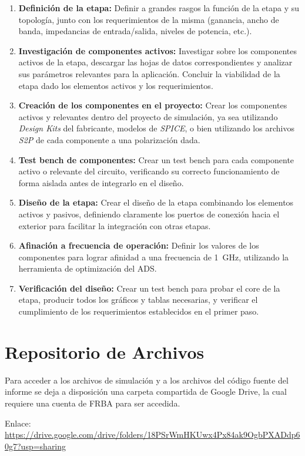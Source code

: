 \begin{enumerate}
    \item \textbf{Definición de la etapa:} Definir a grandes rasgos la función de la etapa y su topología, junto con los requerimientos de la misma (ganancia, ancho de banda, impedancias de entrada/salida, niveles de potencia, etc.).
    
    \item \textbf{Investigación de componentes activos:} Investigar sobre los componentes activos de la etapa, descargar las hojas de datos correspondientes y analizar sus parámetros relevantes para la aplicación. Concluir la viabilidad de la etapa dado los elementos activos y los requerimientos.
    
    \item \textbf{Creación de los componentes en el proyecto:} Crear los componentes activos y relevantes dentro del proyecto de simulación, ya sea utilizando \textit{Design Kits} del fabricante, modelos de \textit{SPICE}, o bien utilizando los archivos \textit{S2P} de cada componente a una polarización dada.
    
    \item \textbf{Test bench de componentes:} Crear un test bench para cada componente activo o relevante del circuito, verificando su correcto funcionamiento de forma aislada antes de integrarlo en el diseño.
    
    \item \textbf{Diseño de la etapa:} Crear el diseño de la etapa combinando los elementos activos y pasivos, definiendo claramente los puertos de conexión hacia el exterior para facilitar la integración con otras etapas.
    
    \item \textbf{Afinación a frecuencia de operación:} Definir los valores de los componentes para lograr afinidad a una frecuencia de \qty{1}{\GHz}, utilizando la herramienta de optimización del ADS.
    
    \item \textbf{Verificación del diseño:} Crear un test bench para probar el core de la etapa, producir todos los gráficos y tablas necesarias, y verificar el cumplimiento de los requerimientos establecidos en el primer paso.
\end{enumerate}

\section{Repositorio de Archivos}

Para acceder a los archivos de simulación y a los archivos del código fuente del informe se deja a disposición una carpeta compartida de Google Drive, la cual requiere una cuenta de FRBA para ser accedida.

\noindent Enlace: \url{https://drive.google.com/drive/folders/18PSrWmHKUwx4Px84ak9OgbPXADdp60g7?usp=sharing}

